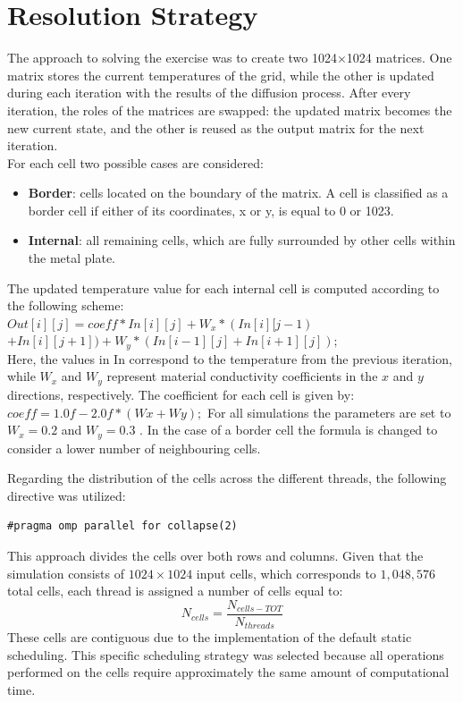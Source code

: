 \documentclass[conference]{IEEEtran}
\numberwithin{figure}{section}
\numberwithin{table}{section}
\begin{document}
\section*{Resolution Strategy}
The approach to solving the exercise was to create two 1024×1024 matrices. One matrix stores the current temperatures of the grid, while the other is updated during each iteration with the results of the diffusion process. After every iteration, the roles of the matrices are swapped: the updated matrix becomes the new current state, and the other is reused as the output matrix for the next iteration.\\
For each cell two possible cases are considered:
\begin{itemize}
\item \textbf{Border}: cells located on the boundary of the matrix. A cell is classified as a border cell if either of its coordinates, x or y, is equal to 0 or 1023.
\item \textbf{Internal}: all remaining cells, which are fully surrounded by other cells within the metal plate.
\end{itemize}
The updated temperature value for each internal cell is computed according to the following scheme:\\
\(Out[i][j] = coeff * In[i][j] + W_x * (In[i][j - 1)\)\\ \(+ In[i][j + 1]) + W_y * (In[i - 1][j] + In[i + 1][j]);\)\\
Here, the values in In correspond to the temperature from the previous iteration, while \(W_x\) and \(W_y\) represent material conductivity coefficients in the \(x\) and \(y\) directions, respectively.
The coefficient for each cell is given by:
\(coeff = 1.0f - 2.0f * (Wx + Wy);\)
For all simulations the parameters are set to $W_x=0.2$ and $W_y=0.3$ .
In the case of a border cell the formula is changed to consider a lower number of neighbouring cells.

Regarding the distribution of the cells across the different threads, the following directive was utilized: 
\begin{lstlisting}[style=cppstyle]
    #pragma omp parallel for collapse(2)
\end{lstlisting}
This approach divides the cells over both rows and columns. Given that the simulation consists of $1024 \times 1024$ input cells, which corresponds to $1{,}048{,}576$ total cells, each thread is assigned a number of cells equal to:
$$N_{cells} = \frac{N_{cells-TOT}}{N_{threads}}$$
These cells are contiguous due to the implementation of the default static scheduling. This specific scheduling strategy was selected because all operations performed on the cells require approximately the same amount of computational time.
\end{document}
